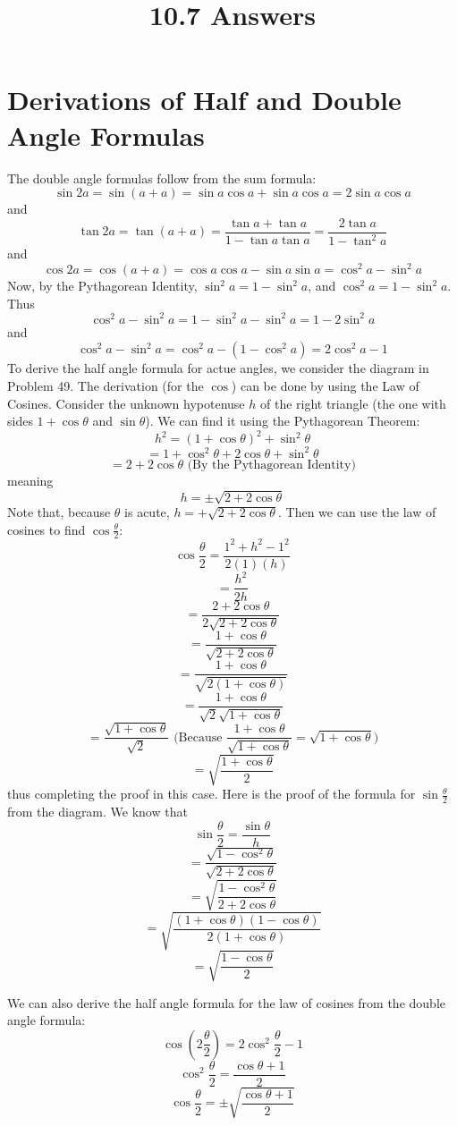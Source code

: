 \documentclass{article}
\title{10.7 Answers}
\theoremstyle{definition}
\newcommand{\?}{\stackrel{?}{=}}
\begin{document}
\maketitle

\section*{Derivations of Half and Double Angle Formulas}
The double angle formulas follow from the sum formula:
\[ \sin 2a=\sin (a+a)=\sin a\cos a+\sin a\cos a=2\sin a\cos a \]
and
\[ \tan 2a=\tan (a+a)=\frac{\tan a+\tan a}{1-\tan a\tan a}=\frac{2\tan a}{1-\tan^2 a} \]
and
\[ \cos 2a=\cos (a+a)=\cos a\cos a-\sin a\sin a=\cos^2 a-\sin^2 a \]
Now, by the Pythagorean Identity, $\sin^2 a=1-\sin^2 a$, and $\cos^2 a=1-\sin^2 a$. Thus
\[ \cos^2 a-\sin^2 a=1-\sin^2 a-\sin^2 a=1-2\sin^2 a \] and
\[ \cos^2 a-\sin^2 a=\cos^2 a-(1-\cos^2 a)=2\cos^2 a-1 \]
To derive the half angle formula for actue angles, we consider the diagram in Problem 49. The derivation (for the $\cos$) can be 
done by using the Law of Cosines. Consider the unknown hypotenuse $h$ of the right triangle (the one with sides $1+\cos\theta$ and $\sin\theta$). 
We can find it using the Pythagorean Theorem:
\[ h^2=(1+\cos\theta)^2+\sin^2\theta \]
\[ =1+\cos^2\theta+2\cos\theta+\sin^2\theta \]
\[ =2+2\cos\theta\textrm{ (By the Pythagorean Identity)} \]
meaning
\[ h=\pm\sqrt{2+2\cos\theta} \]
Note that, because $\theta$ is acute, $h=+\sqrt{2+2\cos\theta}$. Then we can use the law of cosines to find $\cos\frac{\theta}{2}$:
\[ \cos\frac{\theta}{2}=\frac{1^2+h^2-1^2}{2(1)(h)} \]
\[ =\frac{h^2}{2h} \]
\[ =\dfrac{2+2\cos\theta}{2\sqrt{2+2\cos\theta}} \]
\[ =\dfrac{1+\cos\theta}{\sqrt{2+2\cos\theta}} \]
\[ =\dfrac{1+\cos\theta}{\sqrt{2(1+\cos\theta)}} \]
\[ =\dfrac{1+\cos\theta}{\sqrt{2}\sqrt{1+\cos\theta}} \]
\[ =\dfrac{\sqrt{1+\cos\theta}}{\sqrt{2}}\textrm{ (Because $\frac{1+\cos\theta}{\sqrt{1+\cos\theta}}=\sqrt{1+\cos\theta}$)} \]
\[ =\sqrt{\frac{1+\cos\theta}{2}} \]
thus completing the proof in this case. Here is the proof of the formula for $\sin\frac{\theta}{2}$ from the diagram. We know that
\[ \sin\frac{\theta}{2}=\frac{\sin\theta}{h} \]
\[ =\frac{\sqrt{1-\cos^2\theta}}{\sqrt{2+2\cos\theta}} \]
\[ =\sqrt{\frac{1-\cos^2\theta}{2+2\cos\theta}} \]
\[ =\sqrt{\frac{(1+\cos\theta)(1-\cos\theta)}{2(1+\cos\theta)}} \]
\[ =\sqrt{\frac{1-\cos\theta}{2}} \]


We can also derive the half angle formula for the law of cosines from the double angle formula:
\[ \cos(2\frac{\theta}{2})=2\cos^2\frac{\theta}{2}-1 \]
\[ \cos^2\frac{\theta}{2}=\frac{\cos\theta+1}{2} \]
\[ \cos\frac{\theta}{2}=\pm\sqrt{\frac{\cos\theta+1}{2}} \]
\end{document}
